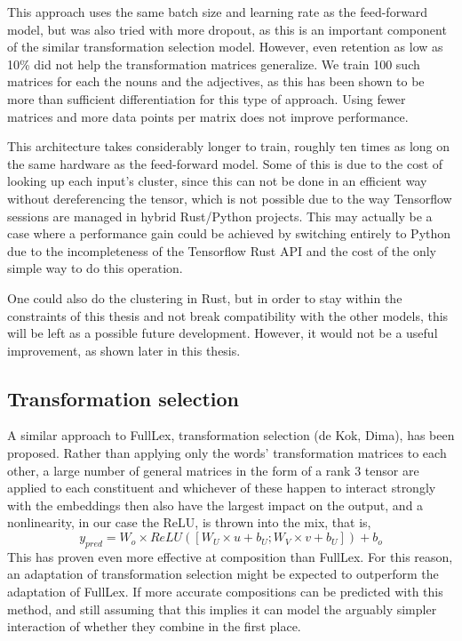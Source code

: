 \documentclass[a4paper, 11pt]{scrartcl}
\begin{document}
This approach uses the same batch size and learning rate as the feed-forward model, but was also tried with more dropout, as this is an important component of the similar transformation selection model. However, even retention as low as 10\% did not help the transformation matrices generalize. We train 100 such matrices for each the nouns and the adjectives, as this has been shown to be more than sufficient differentiation for this type of approach. Using fewer matrices and more data points per matrix does not improve performance.

This architecture takes considerably longer to train, roughly ten times as long on the same hardware as the feed-forward model. Some of this is due to the cost of looking up each input's cluster, since this can not be done in an efficient way without dereferencing the tensor, which is not possible due to the way Tensorflow sessions are managed in hybrid Rust/Python projects. This may actually be a case where a performance gain could be achieved by switching entirely to Python due to the incompleteness of the Tensorflow Rust API and the cost of the only simple way to do this operation.

One could also do the clustering in Rust, but in order to stay within the constraints of this thesis and not break compatibility with the other models, this will be left as a possible future development. However, it would not be a useful improvement, as shown later in this thesis.

\subsection{Transformation selection}
A similar approach to FullLex, transformation selection (de Kok, Dima), has been proposed. Rather than applying only the words' transformation matrices to each other, a large number of general matrices in the form of a rank 3 tensor are applied to each constituent and whichever of these happen to interact strongly with the embeddings then also have the largest impact on the output, and a nonlinearity, in our case the ReLU, is thrown into the mix, that is, $$ y_{pred} = W_o \times ReLU([W_U \times u + b_U; W_V \times v + b_U]) + b_o $$ This has proven even more effective at composition than FullLex. For this reason, an adaptation of transformation selection might be expected to outperform the adaptation of FullLex. If more accurate compositions can be predicted with this method, and still assuming that this implies it can model the arguably simpler interaction of whether they combine in the first place.
\end{document}
